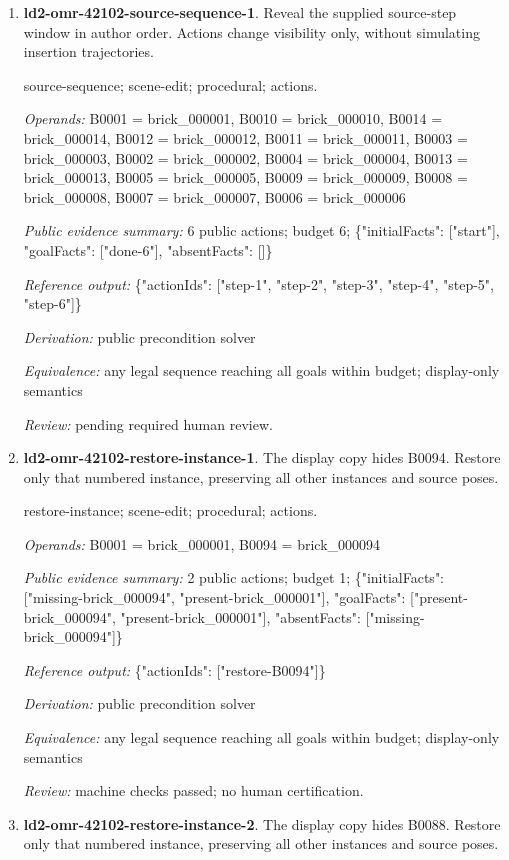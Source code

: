 \begin{enumerate}
\item \textbf{ld2-omr-42102-source-sequence-1}. Reveal the supplied source-step window in author order. Actions change visibility only, without simulating insertion trajectories.
\par{\small source-sequence; scene-edit; procedural; actions.\par\textit{Operands:} B0001 = brick\_000001, B0010 = brick\_000010, B0014 = brick\_000014, B0012 = brick\_000012, B0011 = brick\_000011, B0003 = brick\_000003, B0002 = brick\_000002, B0004 = brick\_000004, B0013 = brick\_000013, B0005 = brick\_000005, B0009 = brick\_000009, B0008 = brick\_000008, B0007 = brick\_000007, B0006 = brick\_000006\par\textit{Public evidence summary:} 6 public actions; budget 6; \{"initialFacts": ["start"], "goalFacts": ["done-6"], "absentFacts": []\}\par\textit{Reference output:} \{"actionIds": ["step-1", "step-2", "step-3", "step-4", "step-5", "step-6"]\}\par\textit{Derivation:} public precondition solver\par\textit{Equivalence:} any legal sequence reaching all goals within budget; display-only semantics\par\textit{Review:} pending required human review.}
\item \textbf{ld2-omr-42102-restore-instance-1}. The display copy hides B0094. Restore only that numbered instance, preserving all other instances and source poses.
\par{\small restore-instance; scene-edit; procedural; actions.\par\textit{Operands:} B0001 = brick\_000001, B0094 = brick\_000094\par\textit{Public evidence summary:} 2 public actions; budget 1; \{"initialFacts": ["missing-brick\_000094", "present-brick\_000001"], "goalFacts": ["present-brick\_000094", "present-brick\_000001"], "absentFacts": ["missing-brick\_000094"]\}\par\textit{Reference output:} \{"actionIds": ["restore-B0094"]\}\par\textit{Derivation:} public precondition solver\par\textit{Equivalence:} any legal sequence reaching all goals within budget; display-only semantics\par\textit{Review:} machine checks passed; no human certification.}
\item \textbf{ld2-omr-42102-restore-instance-2}. The display copy hides B0088. Restore only that numbered instance, preserving all other instances and source poses.

\end{enumerate}
